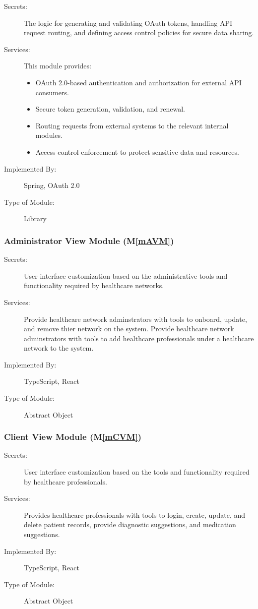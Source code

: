 \documentclass[12pt, titlepage]{article}
\newcommand{\mref}[1]{M\ref{#1}}
\begin{document}
\begin{description}
\item[Secrets:] The logic for generating and validating OAuth tokens, handling API request routing, and defining access control policies for secure data sharing.
\item[Services:] This module provides:
\begin{itemize}
    \item OAuth 2.0-based authentication and authorization for external API consumers.
    \item Secure token generation, validation, and renewal.
    \item Routing requests from external systems to the relevant internal modules.
    \item Access control enforcement to protect sensitive data and resources.
\end{itemize}
\item[Implemented By:] Spring, OAuth 2.0
\item[Type of Module:] Library
\end{description}

\subsubsection{Administrator View Module (\mref{mAVM})}

\begin{description}
\item[Secrets:]User interface customization based on the administrative tools and functionality required by healthcare networks.
\item[Services:]Provide healthcare network adminstrators with tools to onboard, update, and remove thier network on the system. Provide healthcare network adminstrators with tools to add healthcare professionals under a healthcare network to the system.
\item[Implemented By:]TypeScript, React
\item[Type of Module:]Abstract Object
\end{description}

\subsubsection{Client View Module (\mref{mCVM})}

\begin{description}
\item[Secrets:]User interface customization based on the tools and functionality required by healthcare professionals.
\item[Services:]Provides healthcare professionals with tools to login, create, update, and delete patient records, provide diagnostic suggestions, and medication suggestions.
\item[Implemented By:]TypeScript, React
\item[Type of Module:]Abstract Object
\end{description}
\end{document}
